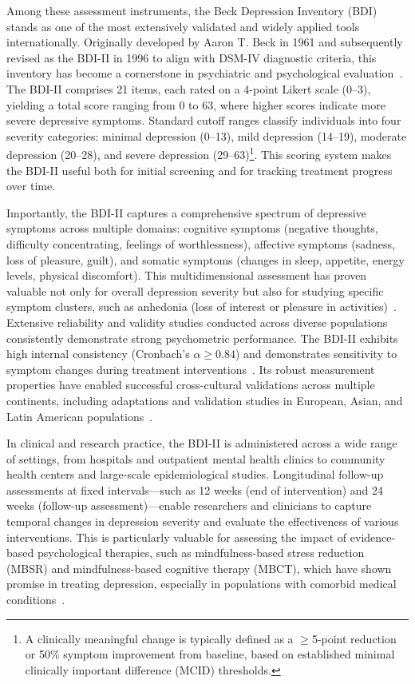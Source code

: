 \documentclass[conference]{IEEEtran}
\begin{document}
Among these assessment instruments, the Beck Depression Inventory (BDI) stands as one of the most extensively validated and widely applied tools internationally. Originally developed by Aaron T. Beck in 1961 and subsequently revised as the BDI-II in 1996 to align with DSM-IV diagnostic criteria, this inventory has become a cornerstone in psychiatric and psychological evaluation~\cite{beck1996manual}. The BDI-II comprises 21 items, each rated on a 4-point Likert scale (0--3), yielding a total score ranging from 0 to 63, where higher scores indicate more severe depressive symptoms. Standard cutoff ranges classify individuals into four severity categories: minimal depression (0--13), mild depression (14--19), moderate depression (20--28), and severe depression (29--63)\footnote{A clinically meaningful change is typically defined as a $\geq$5-point reduction or 50\% symptom improvement from baseline, based on established minimal clinically important difference (MCID) thresholds.}. This scoring system makes the BDI-II useful both for initial screening and for tracking treatment progress over time.


Importantly, the BDI-II captures a comprehensive spectrum of depressive symptoms across multiple domains: cognitive symptoms (negative thoughts, difficulty concentrating, feelings of worthlessness), affective symptoms (sadness, loss of pleasure, guilt), and somatic symptoms (changes in sleep, appetite, energy levels, physical discomfort). This multidimensional assessment has proven valuable not only for overall depression severity but also for studying specific symptom clusters, such as anhedonia (loss of interest or pleasure in activities)~\cite{pizzagalli2005reduced, treadway2009worth}. Extensive reliability and validity studies conducted across diverse populations consistently demonstrate strong psychometric performance. The BDI-II exhibits high internal consistency (Cronbach's $\alpha \geq 0.84$) and demonstrates sensitivity to symptom changes during treatment interventions~\cite{beck1996manual}. Its robust measurement properties have enabled successful cross-cultural validations across multiple continents, including adaptations and validation studies in European, Asian, and Latin American populations~\cite{wang2013psychometric, b4}.


In clinical and research practice, the BDI-II is administered across a wide range of settings, from hospitals and outpatient mental health clinics to community health centers and large-scale epidemiological studies. Longitudinal follow-up assessments at fixed intervals—such as 12 weeks (end of intervention) and 24 weeks (follow-up assessment)—enable researchers and clinicians to capture temporal changes in depression severity and evaluate the effectiveness of various interventions. This is particularly valuable for assessing the impact of evidence-based psychological therapies, such as mindfulness-based stress reduction (MBSR) and mindfulness-based cognitive therapy (MBCT), which have shown promise in treating depression, especially in populations with comorbid medical conditions~\cite{hunot2013mindfulness, b5}.
\end{document}
